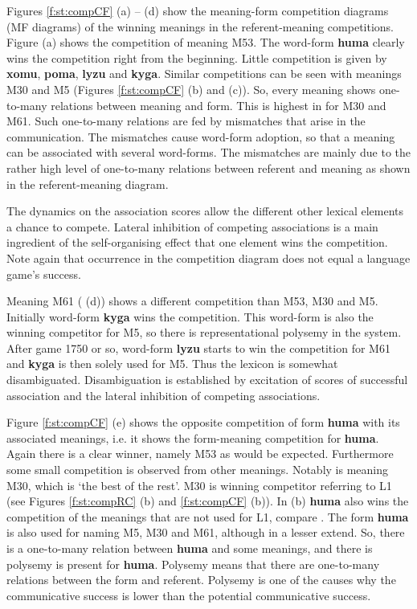 Figures \ref{f:st:compCF} (a) -- (d) show the meaning-form competition diagrams (MF diagrams) of the winning meanings in the referent-meaning competitions. Figure (a) shows the competition of meaning M53. The word-form {\bf huma} clearly wins the competition right from the beginning. Little competition is given by {\bf xomu}, {\bf poma}, {\bf lyzu} and {\bf kyga}. Similar competitions can be seen with meanings M30 and M5 (Figures \ref{f:st:compCF} (b) and (c)). So, every meaning shows one-to-many relations between meaning and form. This is highest in for M30 and M61. Such one-to-many relations are fed by mismatches that arise in the communication. The mismatches cause word-form adoption, so that a meaning can be associated with several word-forms. The mismatches are mainly due to the rather high level of one-to-many relations between referent and meaning as shown in the referent-meaning diagram. 

The dynamics on the association scores allow the different other lexical elements a chance to compete. Lateral inhibition of competing associations is a main ingredient of the self-organising effect that one element wins the competition. Note again that occurrence in the competition diagram does not equal a language game's success.



Meaning M61 ( (d)) shows a different competition than M53, M30 and M5. Initially word-form {\bf kyga} wins the competition. This word-form is also the winning competitor for M5, so there is representational polysemy in the system. After game 1750 or so, word-form {\bf lyzu} starts to win the competition for M61 and {\bf kyga} is then solely used for M5. Thus the lexicon is somewhat disambiguated. Disambiguation is established by excitation of scores of successful association and the lateral inhibition of competing associations.


Figure \ref{f:st:compCF} (e) shows the opposite competition of form {\bf huma} with its associated meanings, i.e. it shows the form-meaning competition for {\bf huma}. Again there is a clear winner, namely M53 as would be expected. Furthermore some small competition is observed from other meanings. Notably is meaning M30, which is `the best of the rest'. M30 is winning competitor referring to L1 (see Figures \ref{f:st:compRC} (b) and \ref{f:st:compCF} (b)). In  (b) {\bf huma} also wins the competition of the meanings that are not used for L1, compare .  The form {\bf huma} is also used for naming M5, M30 and M61, although in a lesser extend. So, there is a one-to-many relation between {\bf huma} and some meanings, and there is polysemy is present for {\bf huma}. Polysemy means that there are one-to-many relations between the form and referent. Polysemy is one of the causes why the communicative success is lower than the potential communicative success.

